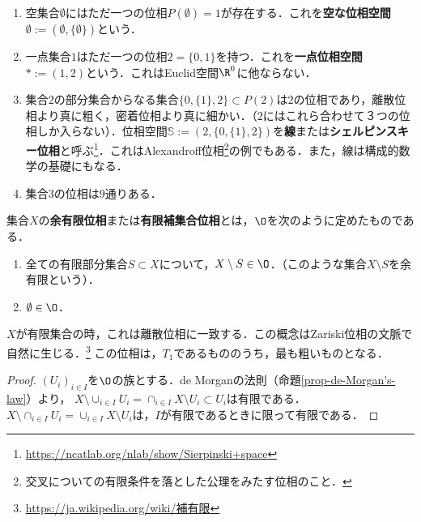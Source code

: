 \documentclass[uplatex,dvipdfmx]{jsreport}
\begin{document}
\begin{example}\mbox{}
    \begin{enumerate}
        \item 空集合$\emptyset$にはただ一つの位相$P(\emptyset)=1$が存在する．これを\textbf{空な位相空間}$\emptyset:=(\emptyset,\{\emptyset\})$という．
        \item 一点集合$1$はただ一つの位相$2=\{0,1\}$を持つ．これを\textbf{一点位相空間}$*:=(1,2)$という．これはEuclid空間$\R^0$に他ならない．
        \item 集合$2$の部分集合からなる集合$\{0,\{1\},2\}\subset P(2)$は$2$の位相であり，離散位相より真に粗く，密着位相より真に細かい．（$2$にはこれら合わせて３つの位相しか入らない）．位相空間$\mathbb{S}:=(2,\{0,\{1\},2\})$を\textbf{線}または\textbf{シェルピンスキー位相}と呼ぶ\footnote{\url{https://ncatlab.org/nlab/show/Sierpinski+space}}．これはAlexandroff位相\footnote{交叉についての有限条件を落とした公理をみたす位相のこと．}の例でもある．また，線は構成的数学の基礎にもなる．
        \item 集合$3$の位相は$9$通りある．
    \end{enumerate}
\end{example}

\begin{example}\label{example-cofinite-topology}
    集合$X$の\textbf{余有限位相}または\textbf{有限補集合位相}とは，$\O$を次のように定めたものである．
    \begin{enumerate}
        \item 全ての有限部分集合$S\subset X$について，$X\setminus S\in\O$．（このような集合$X\setminus S$を余有限という）．
        \item $\emptyset\in\O$．
    \end{enumerate}
    $X$が有限集合の時，これは離散位相に一致する．この概念はZariski位相の文脈で自然に生じる．\footnote{\url{https://ja.wikipedia.org/wiki/補有限}}
    この位相は，$T_1$であるもののうち，最も粗いものとなる．
\end{example}
\begin{proof}
    $(U_i)_{i\in I}$を$\O$の族とする．de Morganの法則（命題\ref{prop-de-Morgan's-law}）より，
    $X\setminus\cup_{i\in I}U_i=\cap_{i\in I}X\setminus U_i\subset U_i$は有限である．
    $X\setminus\cap_{i\in I}U_i=\cup_{i\in I}X\setminus U_i$は，$I$が有限であるときに限って有限である．
\end{proof}
\end{document}

